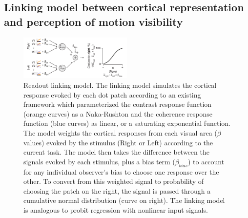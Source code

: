 \documentclass{report}
\begin{document}
\subsection{Linking model between cortical representation and perception of motion visibility}

\begin{figure}
\centering
\includegraphics[keepaspectratio,width=0.5\textwidth]{figs_c2/Fig4_linkingmodel.pdf}
\caption[Readout linking model]{Readout linking model. The linking model simulates the cortical response evoked by each dot patch according to an existing framework \citep{Birman2018-sp} which parameterized the contrast response function (orange curves) as a Naka-Rushton and the coherence response function (blue curves) as linear, or a saturating exponential function. The model weights the cortical responses from each visual area ($\beta$ values) evoked by the stimulus (Right or Left) according to the current task. The model then takes the difference between the signals evoked by each stimulus, plus a bias term ($\beta_{bias}$) to account for any individual observer’s bias to choose one response over the other. To convert from this weighted signal to probability of choosing the patch on the right, the signal is passed through a cumulative normal distribution (curve on right). The linking model is analogous to probit regression with nonlinear input signals.}
\label{fig:c4f4}
\end{figure}
\end{document}
